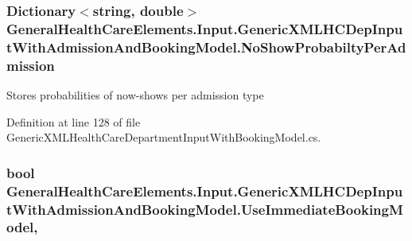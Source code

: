 \subsubsection[{\texorpdfstring{No\+Show\+Probabilty\+Per\+Admission}{NoShowProbabiltyPerAdmission}}]{\setlength{\rightskip}{0pt plus 5cm}Dictionary$<$string, double$>$ General\+Health\+Care\+Elements.\+Input.\+Generic\+X\+M\+L\+H\+C\+Dep\+Input\+With\+Admission\+And\+Booking\+Model.\+No\+Show\+Probabilty\+Per\+Admission\hspace{0.3cm}{\ttfamily [get]}}\hypertarget{class_general_health_care_elements_1_1_input_1_1_generic_x_m_l_h_c_dep_input_with_admission_and_booking_model_a573843c8d47aebb00332b52a262bc3c8}{}\label{class_general_health_care_elements_1_1_input_1_1_generic_x_m_l_h_c_dep_input_with_admission_and_booking_model_a573843c8d47aebb00332b52a262bc3c8}


Stores probabilities of now-\/shows per admission type 



Definition at line 128 of file Generic\+X\+M\+L\+Health\+Care\+Department\+Input\+With\+Booking\+Model.\+cs.

\subsubsection[{\texorpdfstring{Use\+Immediate\+Booking\+Model}{UseImmediateBookingModel}}]{\setlength{\rightskip}{0pt plus 5cm}bool General\+Health\+Care\+Elements.\+Input.\+Generic\+X\+M\+L\+H\+C\+Dep\+Input\+With\+Admission\+And\+Booking\+Model.\+Use\+Immediate\+Booking\+Model\hspace{0.3cm}{\ttfamily [get]}, {\ttfamily [set]}}\hypertarget{class_general_health_care_elements_1_1_input_1_1_generic_x_m_l_h_c_dep_input_with_admission_and_booking_model_ab2b797c7746509feddbd0ae668f14181}{}\label{class_general_health_care_elements_1_1_input_1_1_generic_x_m_l_h_c_dep_input_with_admission_and_booking_model_ab2b797c7746509feddbd0ae668f14181}



